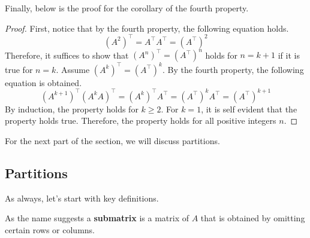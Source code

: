 \documentclass[../main.tex]{subfiles}
\begin{document}
Finally, below is the proof for the corollary of the fourth property.

\begin{proof}
First, notice that by the fourth property, the following equation
holds.
\[
\left( A^2 \right)^\intercal
= A^\intercal A^\intercal
= \left( A^\intercal \right)^2
\]
Therefore, it suffices to show that $(A^n)^\intercal =
(A^\intercal)^n$ holds for $n = k + 1$ if it is true for $n = k$.
Assume $(A^k)^\intercal = (A^\intercal)^k$. By the fourth property,
the following equation is obtained.
\[
\left( A^{k+1} \right)^\intercal
(A^k A)^\intercal
= (A^k)^\intercal A^\intercal
= (A^\intercal)^k A^\intercal
= (A^\intercal)^{k + 1}
\]
By induction, the property holds for $k \geq 2$. For $k = 1$,
it is self evident that the property holds true. Therefore, the
property holds for all positive integers $n$.
\end{proof}

For the next part of the section, we will discuss partitions.

\subsection{Partitions}

As always, let's start with key definitions.

\begin{definition}{}{}
As the name suggests a \textbf{submatrix} is a matrix of $A$ that
is obtained by omitting certain rows or columns.
\end{definition}
\end{document}
